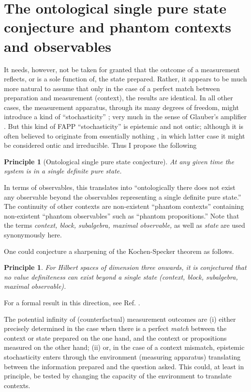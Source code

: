 \documentclass[%
  preprint,
 showpacs,
 showkeys,
 preprintnumbers,
 amsmath,amssymb,
 aps,
   pra,
  longbibliography,
 ]{revtex4-1}
\newtheorem{conjecture}[question]{Principle}
\begin{document}
\section{The ontological single pure state conjecture and phantom contexts and observables}

It needs, however, not be taken for granted that the outcome of a measurement
reflects, or is a sole function of, the state prepared.
Rather, it appears to be much more natural to assume that only in the case of a
perfect match between preparation and measurement (context), the results are identical.
In all other cases, the measurement apparatus, through its many degrees of freedom,
might introduce a kind of ``stochasticity''
\cite{svozil-2003-garda,svozil-2011-jesuitlies};
very much in the sense of Glauber's amplifier
\cite{glauber,Glauber-cat-86,glauber-collected-cat}.
But this kind of FAPP ``stochasticity'' is epistemic and not ontic;
although it is often believed to originate from
essentially nothing \cite{zeil-99,zeil-05_nature_ofQuantum}, in which latter case it might be considered ontic and irreducible.
Thus I propose the following
{\color{blue} \begin{conjecture}[Ontological single pure state conjecture]
At any given time the system is in a single definite pure state.
\end{conjecture}   }
In terms of observables, this translates into
``ontologically there does not exist any observable beyond the observables representing a single definite pure state.''
The continuity of  other contexts are non-existent ``phantom contexts'' containing non-existent
``phantom observables'' such as ``phantom propositions.''
Note that the terms {\em context, block, subalgebra, maximal observable,} as well as {\em state} are used synonymously here.

One could conjecture a sharpening of the Kochen-Specker theorem as follows.
{\color{blue} \begin{conjecture}
For Hilbert spaces of dimension three onwards,
it is conjectured that no value definiteness can exist beyond a single state
(context, block, subalgebra, maximal observable).
\end{conjecture}   }
For a formal result in this direction, see Ref. \cite[Theorem 9, Corollary 12]{2012-incomput-proofsCJ}.



The potential infinity of (counterfactual) measurement outcomes
are (i) either precisely determined in the case when there is a perfect {\em match} between the context or state prepared on the one hand,
and the context or propositions measured on the other hand;
(ii) or, in the case of a context mismatch, epistemic stochasticity enters through the environment (measuring apparatus)
translating \cite{svozil-2003-garda} between the information prepared and the question asked.
This could, at least in principle, be tested by changing the capacity of the environment to translate contexts.
\end{document}
